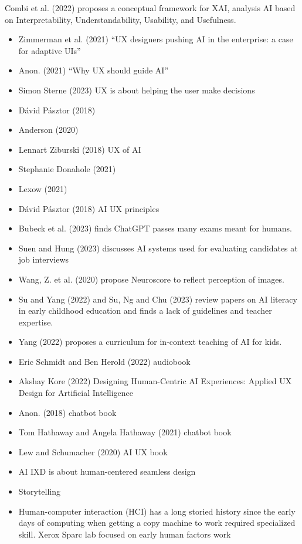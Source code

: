 \documentclass[
  letterpaper,
  DIV=11,
  numbers=noendperiod]{scrartcl}
\begin{document}
Combi et al. (2022) proposes a conceptual framework for XAI, analysis AI
based on Interpretability, Understandability, Usability, and Usefulness.

\begin{itemize}
\item
  Zimmerman et al. (2021) ``UX designers pushing AI in the enterprise: a
  case for adaptive UIs''
\item
  Anon. (2021) ``Why UX should guide AI''
\item
  Simon Sterne (2023) UX is about helping the user make decisions
\item
  Dávid Pásztor (2018)
\item
  Anderson (2020)
\item
  Lennart Ziburski (2018) UX of AI
\item
  Stephanie Donahole (2021)
\item
  Lexow (2021)
\item
  Dávid Pásztor (2018) AI UX principles
\item
  Bubeck et al. (2023) finds ChatGPT passes many exams meant for humans.
\item
  Suen and Hung (2023) discusses AI systems used for evaluating
  candidates at job interviews
\item
  Wang, Z. et al. (2020) propose Neuroscore to reflect perception of
  images.
\item
  Su and Yang (2022) and Su, Ng and Chu (2023) review papers on AI
  literacy in early childhood education and finds a lack of guidelines
  and teacher expertise.
\item
  Yang (2022) proposes a curriculum for in-context teaching of AI for
  kids.
\item
  Eric Schmidt and Ben Herold (2022) audiobook
\item
  Akshay Kore (2022) Designing Human-Centric AI Experiences: Applied UX
  Design for Artificial Intelligence
\item
  Anon. (2018) chatbot book
\item
  Tom Hathaway and Angela Hathaway (2021) chatbot book
\item
  Lew and Schumacher (2020) AI UX book
\item
  AI IXD is about human-centered seamless design
\item
  Storytelling
\item
  Human-computer interaction (HCI) has a long storied history since the
  early days of computing when getting a copy machine to work required
  specialized skill. Xerox Sparc lab focused on early human factors work

\end{itemize}
\end{document}
